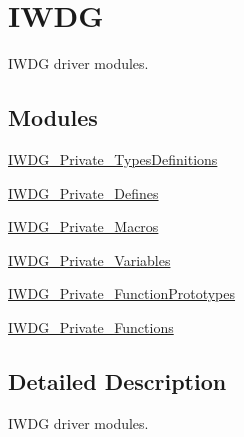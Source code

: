 \hypertarget{group___i_w_d_g}{\section{I\-W\-D\-G}
\label{group___i_w_d_g}
}


I\-W\-D\-G driver modules.  


\subsection*{Modules}
\begin{DoxyCompactItemize}
\item 
\hyperlink{group___i_w_d_g___private___types_definitions}{I\-W\-D\-G\-\_\-\-Private\-\_\-\-Types\-Definitions}
\item 
\hyperlink{group___i_w_d_g___private___defines}{I\-W\-D\-G\-\_\-\-Private\-\_\-\-Defines}
\item 
\hyperlink{group___i_w_d_g___private___macros}{I\-W\-D\-G\-\_\-\-Private\-\_\-\-Macros}
\item 
\hyperlink{group___i_w_d_g___private___variables}{I\-W\-D\-G\-\_\-\-Private\-\_\-\-Variables}
\item 
\hyperlink{group___i_w_d_g___private___function_prototypes}{I\-W\-D\-G\-\_\-\-Private\-\_\-\-Function\-Prototypes}
\item 
\hyperlink{group___i_w_d_g___private___functions}{I\-W\-D\-G\-\_\-\-Private\-\_\-\-Functions}
\end{DoxyCompactItemize}


\subsection{Detailed Description}
I\-W\-D\-G driver modules. 